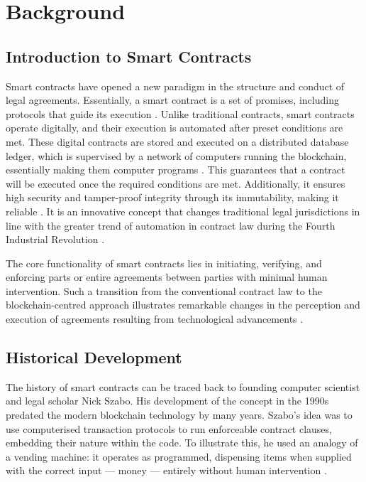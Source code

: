 \chapter{Background}

\section{Introduction to Smart Contracts}

Smart contracts have opened a new paradigm in the structure and conduct of legal agreements. Essentially, a smart contract is a set of promises, including protocols that guide its execution \cite{ZhengEtAl2020}. Unlike traditional contracts, smart contracts operate digitally, and their execution is automated after preset conditions are met. These digital contracts are stored and executed on a distributed database ledger, which is supervised by a network of computers running the blockchain, essentially making them computer programs \cite{Mik2017}. This guarantees that a contract will be executed once the required conditions are met. Additionally, it ensures high security and tamper-proof integrity through its immutability, making it reliable \cite{Durovic2021}. It is an innovative concept that changes traditional legal jurisdictions in line with the greater trend of automation in contract law during the Fourth Industrial Revolution \cite{Durovic2021}. 

The core functionality of smart contracts lies in initiating, verifying, and enforcing parts or entire agreements between parties with minimal human intervention. Such a transition from the conventional contract law to the blockchain-centred approach illustrates remarkable changes in the perception and execution of agreements resulting from technological advancements \cite{Durovic2021}.

\section{Historical Development}

The history of smart contracts can be traced back to founding computer scientist and legal scholar Nick Szabo. His development of the concept in the 1990s predated the modern blockchain technology by many years. Szabo's idea was to use computerised transaction protocols to run enforceable contract clauses, embedding their nature within the code. To illustrate this, he used an analogy of a vending machine: it operates as programmed, dispensing items when supplied with the correct input — money — entirely without human intervention \cite{Szabo1997}.


